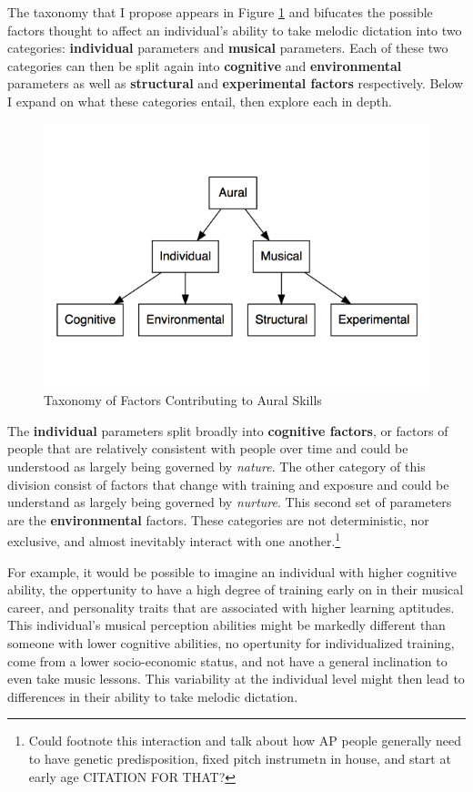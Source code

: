 \documentclass[]{book}
\let\rmarkdownfootnote\footnote%
\def\footnote{\protect\rmarkdownfootnote}
\begin{document}
The taxonomy that I propose appears in Figure \ref{fig:taxonomy} and bifucates the possible factors thought to affect an individual's ability to take melodic dictation into two categories: \textbf{individual} parameters and \textbf{musical} parameters.
Each of these two categories can then be split again into \textbf{cognitive} and \textbf{environmental} parameters as well as \textbf{structural} and \textbf{experimental factors} respectively.
Below I expand on what these categories entail, then explore each in depth.

\begin{figure}

{\centering \includegraphics[width=0.8\linewidth]{img/taxonomy4} 

}

\caption{Taxonomy of Factors Contributing to Aural Skills}\label{fig:taxonomy}
\end{figure}

The \textbf{individual} parameters split broadly into \textbf{cognitive factors}, or factors of people that are relatively consistent with people over time and could be understood as largely being governed by \emph{nature}.
The other category of this division consist of factors that change with training and exposure and could be understand as largely being governed by \emph{nurture}.
This second set of parameters are the \textbf{environmental} factors.
These categories are not deterministic, nor exclusive, and almost inevitably interact with one another.\footnote{Could footnote this interaction and talk about how AP people generally need to have genetic predisposition, fixed pitch instrumetn in house, and start at early age CITATION FOR THAT?}

For example, it would be possible to imagine an individual with higher cognitive ability, the oppertunity to have a high degree of training early on in their musical career, and personality traits that are associated with higher learning aptitudes.
This individual's musical perception abilities might be markedly different than someone with lower cognitive abilities, no opertunity for individualized training, come from a lower socio-economic status, and not have a general inclination to even take music lessons.
This variability at the individual level might then lead to differences in their ability to take melodic dictation.
\end{document}
